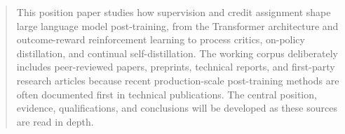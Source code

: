 \maketitle

\begin{abstract}
This position paper studies how supervision and credit assignment shape large language
model post-training, from the Transformer architecture and outcome-reward reinforcement
learning to process critics, on-policy distillation, and continual self-distillation. The
working corpus deliberately includes peer-reviewed papers, preprints, technical reports,
and first-party research articles because recent production-scale post-training methods
are often documented first in technical publications. The central position, evidence,
qualifications, and conclusions will be developed as these sources are read in depth.
\end{abstract}

\tableofcontents

